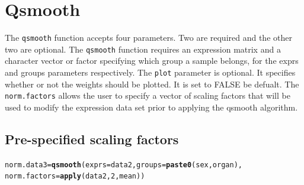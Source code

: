 \documentclass{article}\usepackage[]{graphicx}\usepackage[usenames,dvipsnames]{color}
\makeatletter
\newcommand{\hlnum}[1]{\textcolor[rgb]{0.686,0.059,0.569}{#1}}%
\newcommand{\hlstd}[1]{\textcolor[rgb]{0.345,0.345,0.345}{#1}}%
\newcommand{\hlkwb}[1]{\textcolor[rgb]{0.69,0.353,0.396}{#1}}%
\newcommand{\hlkwc}[1]{\textcolor[rgb]{0.333,0.667,0.333}{#1}}%
\newcommand{\hlkwd}[1]{\textcolor[rgb]{0.737,0.353,0.396}{\textbf{#1}}}%
\newenvironment{kframe}{%
 \def\at@end@of@kframe{}%
 \ifinner\ifhmode%
  \def\at@end@of@kframe{\end{minipage}}%
  \begin{minipage}{\columnwidth}%
 \fi\fi%
 \def\FrameCommand##1{\hskip\@totalleftmargin \hskip-\fboxsep
 \colorbox{shadecolor}{##1}\hskip-\fboxsep
     \hskip-\linewidth \hskip-\@totalleftmargin \hskip\columnwidth}%
 \MakeFramed {\advance\hsize-\width
   \@totalleftmargin\z@ \linewidth\hsize
   \@setminipage}}%
 {\par\unskip\endMakeFramed%
 \at@end@of@kframe}
\newenvironment{knitrout}{}{} %
\makeatother
\begin{document}
\section{Qsmooth}
The \texttt{qsmooth} function accepts four parameters. 
Two are required and the other two are optional.
The \texttt{qsmooth} function requires an expression matrix and a 
character vector or factor specifying which group a sample belongs,
for the exprs and groups parameters respectively.
The \texttt{plot} parameter is optional. It specifies whether or
not the weights should be plotted. It is set to FALSE be defualt.
The \texttt{norm.factors} allows the user to specify a 
vector of scaling factors that will be used to modify the 
expression data set prior to applying the qsmooth algorithm.

\subsection{Pre-specified scaling factors}

\begin{knitrout}
\color{fgcolor}\begin{kframe}
\begin{alltt}
\hlstd{norm.data3} \hlkwb{=} \hlkwd{qsmooth}\hlstd{(}\hlkwc{exprs}\hlstd{=data2,} \hlkwc{groups}\hlstd{=}\hlkwd{paste0}\hlstd{(sex, organ),}
                     \hlkwc{norm.factors} \hlstd{=} \hlkwd{apply}\hlstd{(data2,} \hlnum{2}\hlstd{, mean))}
\end{alltt}
\end{kframe}
\end{knitrout}
\end{document}
